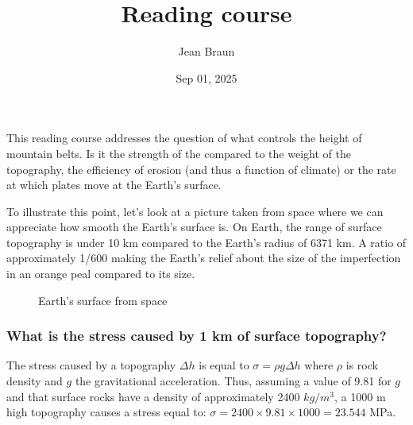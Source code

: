 \documentclass[letterpaper,10pt,english]{jupyterBook}
\title{Reading course}
\date{Sep 01, 2025}
\author{Jean Braun}
\let\sphinxpxdimen\pdfpxdimen\else\newdimen\sphinxpxdimen
\begin{document}
\pagestyle{empty}
\sphinxmaketitle
\pagestyle{plain}
\sphinxtableofcontents
\pagestyle{normal}
\label{\detokenize{intro::doc}}


\begin{DUlineblock}{0em}
\item[] 
\end{DUlineblock}

\sphinxAtStartPar
This reading course addresses the question of what controls the height of mountain belts. Is it the strength of the {\hyperref[\detokenize{glossary:term-Lithosphere}]{}} compared to the weight of the topography, the efficiency of erosion (and thus a function of climate) or the rate at which plates move at the Earth’s surface.

\begin{DUlineblock}{0em}
\item[] 
\end{DUlineblock}

\sphinxAtStartPar
To illustrate this point, let’s look at a picture taken from space where we can appreciate how smooth the Earth’s surface is. On Earth, the range of surface topography is under 10 km compared to the Earth’s radius of 6371 km. A ratio of approximately 1/600 making the Earth’s relief about the size of the imperfection in an orange peal compared to its size.

\begin{figure}[htbp]
\centering
\capstart

\noindent\sphinxincludegraphics[height=150\sphinxpxdimen]{{fromspace}.png}
\caption{Earth’s surface from space}\label{\detokenize{intro:smooth-earth}}\end{figure}
\subsubsection*{What is the stress caused by 1 km of surface topography?}

\sphinxAtStartPar
The stress caused by a topography \(\Delta h\) is equal to \(\sigma=\rho g \Delta h\) where \(\rho\) is rock density and \(g\) the gravitational acceleration. Thus, assuming a value of 9.81 for \(g\) and that surface rocks have a density of approximately 2400 \(kg/m^3\), a 1000 m high topography causes a stress equal to:
\(\sigma = 2400\times 9.81 \times 1000 = 23.544\) MPa.

\begin{DUlineblock}{0em}
\item[] 
\end{DUlineblock}
\end{document}
